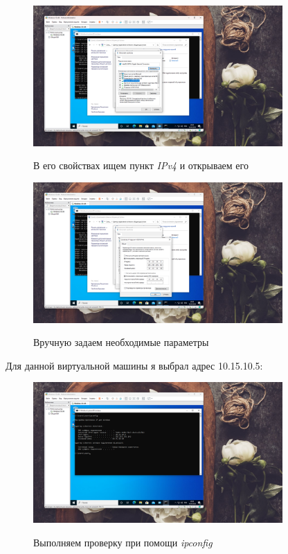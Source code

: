 \documentclass[a4paper]{article}
\begin{document}
  \begin{figure}[H]
    \centering
    \includegraphics[width=0.85\textwidth]{06_00 (23)}
    \label{img:23}
    \caption{В его свойствах ищем пункт \textit{IPv4} и открываем его}
  \end{figure}
  
  \begin{figure}[H]
    \centering
    \includegraphics[width=0.85\textwidth]{06_00 (24)}
    \label{img:24}
    \caption{Вручную задаем необходимые параметры}
  \end{figure}

  Для данной виртуальной машины я выбрал адрес 10.15.10.5:
  
  \begin{figure}[H]
    \centering
    \includegraphics[width=0.85\textwidth]{06_00 (25)}
    \label{img:25}
    \caption{Выполняем проверку при помощи \textit{ipconfig}}
  \end{figure}
  
\end{document}
